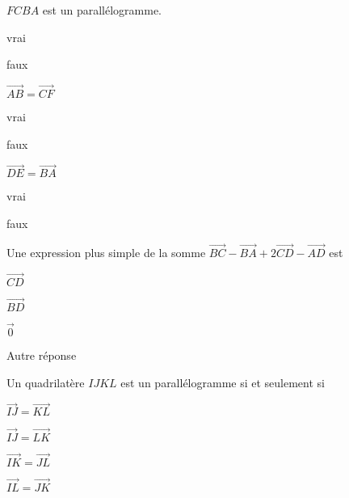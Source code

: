 \begin{QCM}
\begin{GroupeQCM}
\begin{exercice}$FCBA$ est un parallélogramme.
\begin{ChoixQCM}{2}
\item vrai
\item faux
\end{ChoixQCM}
\begin{corrige}
\end{corrige}
\end{exercice}


\begin{exercice}$\overrightarrow{AB}=\overrightarrow{CF}$
\begin{ChoixQCM}{2}
\item vrai
\item faux
\end{ChoixQCM}
\begin{corrige}
\end{corrige}
\end{exercice}

\begin{exercice}$\overrightarrow{DE}=\overrightarrow{BA}$
\begin{ChoixQCM}{2}
\item vrai
\item faux
\end{ChoixQCM}
\begin{corrige}
\end{corrige}
\end{exercice}

\begin{exercice}Une expression plus simple de la somme $\overrightarrow{BC}-\overrightarrow{BA}+2\overrightarrow{CD}-\overrightarrow{AD}$ est
\begin{ChoixQCM}{4}
\item $\overrightarrow{CD}$
\item $\overrightarrow{BD}$
\item $\overrightarrow{0}$
\item Autre réponse
\end{ChoixQCM}
\begin{corrige}
\end{corrige}
\end{exercice}

\begin{exercice}Un quadrilatère $IJKL$ est un parallélogramme si et seulement si
\begin{ChoixQCM}{4}
\item $\overrightarrow{IJ}=\overrightarrow{KL}$
\item $\overrightarrow{IJ}=\overrightarrow{LK}$
\item $\overrightarrow{IK}=\overrightarrow{JL}$
\item $\overrightarrow{IL}=\overrightarrow{JK}$
\end{ChoixQCM}
\begin{corrige}
\end{corrige}
\end{exercice}


\end{GroupeQCM}
\end{QCM}

